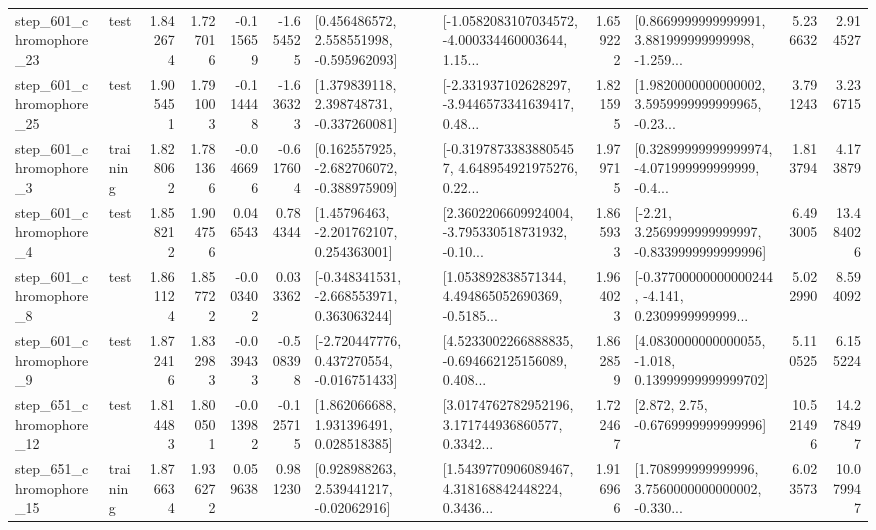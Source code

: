 \begin{tabular}{llrrrrllrlrr}
  step\_601\_chromophore\_23 &      test &      1.842674 &    1.727016 &     -0.115659 & -1.654525 &    [0.456486572, 2.558551998, -0.595962093] &  [-1.0582083107034572, -4.000334460003644, 1.15... &       1.659222 &  [0.8669999999999991, 3.881999999999998, -1.259... &            5.236632 &          2.914527 \\
  step\_601\_chromophore\_25 &      test &      1.905451 &    1.791003 &     -0.114448 & -1.636323 &    [1.379839118, 2.398748731, -0.337260081] &  [-2.331937102628297, -3.9446573341639417, 0.48... &       1.821595 &  [1.9820000000000002, 3.5959999999999965, -0.23... &            3.791243 &          3.236715 \\
   step\_601\_chromophore\_3 &  training &      1.828062 &    1.781366 &     -0.046696 & -0.617604 &   [0.162557925, -2.682706072, -0.388975909] &  [-0.31978733838805457, 4.648954921975276, 0.22... &       1.979715 &  [0.32899999999999974, -4.071999999999999, -0.4... &            1.813794 &          4.173879 \\
   step\_601\_chromophore\_4 &      test &      1.858212 &    1.904756 &      0.046543 &  0.784344 &     [1.45796463, -2.201762107, 0.254363001] &  [2.3602206609924004, -3.795330518731932, -0.10... &       1.865933 &   [-2.21, 3.2569999999999997, -0.8339999999999996] &            6.493005 &         13.484026 \\
   step\_601\_chromophore\_8 &      test &      1.861124 &    1.857722 &     -0.003402 &  0.033362 &   [-0.348341531, -2.668553971, 0.363063244] &  [1.053892838571344, 4.494865052690369, -0.5185... &       1.964023 &  [-0.37700000000000244, -4.141, 0.2309999999999... &            5.022990 &          8.594092 \\
   step\_601\_chromophore\_9 &      test &      1.872416 &    1.832983 &     -0.039433 & -0.508398 &   [-2.720447776, 0.437270554, -0.016751433] &  [4.5233002266888835, -0.694662125156089, 0.408... &       1.862859 &  [4.0830000000000055, -1.018, 0.13999999999999702] &            5.110525 &          6.155224 \\
  step\_651\_chromophore\_12 &      test &      1.814483 &    1.800501 &     -0.013982 & -0.125715 &     [1.862066688, 1.931396491, 0.028518385] &  [3.0174762782952196, 3.171744936860577, 0.3342... &       1.722467 &                 [2.872, 2.75, -0.6769999999999996] &           10.521496 &         14.278497 \\
  step\_651\_chromophore\_15 &  training &      1.876634 &    1.936272 &      0.059638 &  0.981230 &     [0.928988263, 2.539441217, -0.02062916] &  [1.5439770906089467, 4.318168842448224, 0.3436... &       1.916966 &  [1.708999999999996, 3.7560000000000002, -0.330... &            6.023573 &         10.079947 \\

\end{tabular}
